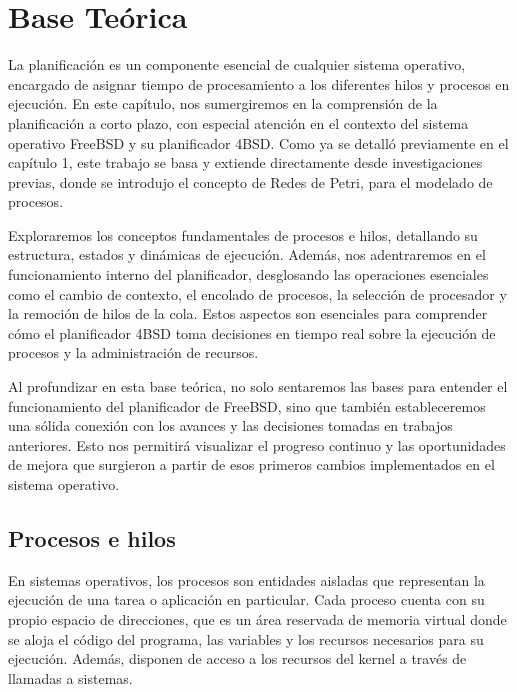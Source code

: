 \section{Base Teórica}

La planificación es un componente esencial de cualquier sistema operativo, encargado de asignar tiempo de procesamiento a los diferentes hilos y procesos en ejecución. En este capítulo, nos sumergiremos en la comprensión de la planificación a corto plazo, con especial atención en el contexto del sistema operativo FreeBSD y su planificador 4BSD. Como ya se detalló previamente en el capítulo 1, este trabajo se basa y extiende directamente desde investigaciones previas\cite{bib1}, donde se introdujo el concepto de Redes de Petri, para el modelado de procesos.\par

Exploraremos los conceptos fundamentales de procesos e hilos, detallando su estructura, estados y dinámicas de ejecución. Además, nos adentraremos en el funcionamiento interno del planificador, desglosando las operaciones esenciales como el cambio de contexto, el encolado de procesos, la selección de procesador y la remoción de hilos de la cola. Estos aspectos son esenciales para comprender cómo el planificador 4BSD toma decisiones en tiempo real sobre la ejecución de procesos y la administración de recursos.\par

Al profundizar en esta base teórica, no solo sentaremos las bases para entender el funcionamiento del planificador de FreeBSD, sino que también estableceremos una sólida conexión con los avances y las decisiones tomadas en trabajos anteriores. Esto nos permitirá visualizar el progreso continuo y las oportunidades de mejora que surgieron a partir de esos primeros cambios implementados en el sistema operativo.\par

\subsection{Procesos e hilos}

En sistemas operativos, los procesos son entidades aisladas que representan la ejecución de una tarea o aplicación en particular. Cada proceso cuenta con su propio espacio de direcciones, que es un área reservada de memoria virtual donde se aloja el código del programa, las variables y los recursos necesarios para su ejecución. Además, disponen de acceso a los recursos del kernel a través de llamadas a sistemas.\par

